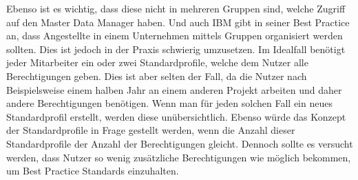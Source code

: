 Ebenso ist es wichtig, dass diese nicht in mehreren Gruppen sind, welche Zugriff auf den Master Data Manager haben.
Und auch IBM gibt in seiner Best Practice an, dass Angestellte in einem Unternehmen mittels Gruppen organisiert werden sollten. \cite{IBMGroup}
\newline
Dies ist jedoch in der Praxis schwierig umzusetzen.
Im Idealfall benötigt jeder Mitarbeiter ein oder zwei Standardprofile, welche dem Nutzer alle Berechtigungen geben.
Dies ist aber selten der Fall, da die Nutzer nach Beispielsweise einem halben Jahr an einem anderen Projekt arbeiten und daher andere Berechtigungen benötigen.
Wenn man für jeden solchen Fall ein neues Standardprofil erstellt, werden diese unübersichtlich.
Ebenso würde das Konzept der Standardprofile in Frage gestellt werden, wenn die Anzahl dieser Standardprofile der Anzahl der Berechtigungen gleicht.
Dennoch sollte es versucht werden, dass Nutzer so wenig zusätzliche Berechtigungen wie möglich bekommen, um Best Practice Standards einzuhalten. 

